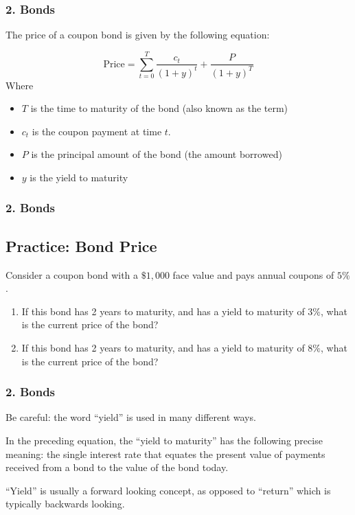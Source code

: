 \documentclass{beamer}
\begin{document}
\begin{frame}[t]
    \frametitle{2. Bonds}

    The price of a coupon bond is given by the following equation:

    $$
    \text{Price} = \sum_{t=0}^{T} \frac{c_t}{(1+y)^t} + \frac{P}{(1+y)^T}
    $$
    Where
    \begin{itemize}
        \item $T$ is the time to maturity of the bond (also known as the term)
        \item $c_t$ is the coupon payment at time $t$.
        \item $P$ is the principal amount of the bond (the amount borrowed)
        \item $y$ is the yield to maturity
    \end{itemize}

\end{frame}

\begin{practiceframe}
    \frametitle{2. Bonds}
    \subsection{Practice: Bond Price}

    Consider a coupon bond with a $\$1,000$ face value and pays annual coupons of $5\%$. 
    \begin{enumerate}
    \item If this bond has 2 years to maturity, and has a yield to maturity of $3\%$, what is the current price of the bond?
    \item If this bond has 2 years to maturity, and has a yield to maturity of $8\%$, what is the current price of the bond?
    \end{enumerate}

    
\end{practiceframe}

\begin{frame}[t]
    \frametitle{2. Bonds}

    Be careful: the word “yield” is used in many different ways.
    \vspace{1em}

    In the preceding equation, the “yield to maturity” has the following precise meaning: the single interest rate that equates the present value of payments received from a bond to the value of the bond today.
    \vspace{1em}
    
    “Yield” is usually a forward looking concept, as opposed to “return” which is typically backwards looking.

\end{frame}
\end{document}
